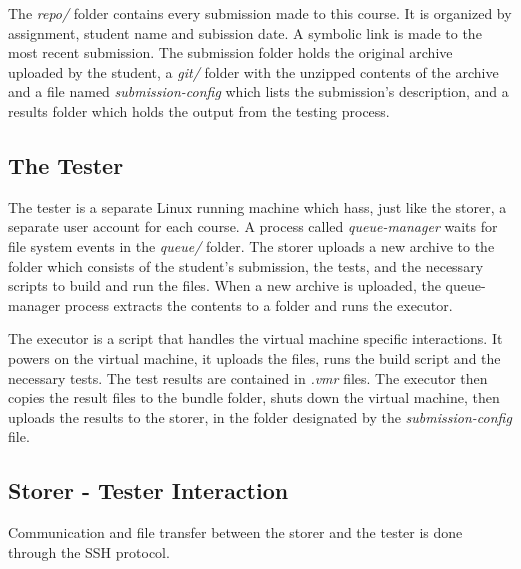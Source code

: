 \begin{center}
\end{center}

The \textit{repo/} folder contains every submission made to this course. It is organized
by assignment, student name and subission date. A symbolic link is made to the 
most recent submission. The submission folder holds the original archive uploaded
by the student, a \textit{git/} folder with the unzipped contents of the archive and a 
file named \textit{submission-config} which lists the submission's description, and a
results folder which holds the output from the testing process.

\subsection{The Tester}
\label{sub-sec:tester}

The tester is a separate Linux running machine which hass, just like the storer,
a separate user account for each course. A process called \textit{queue-manager}
waits for file system events in the \textit{queue/} folder. The storer uploads a new
archive to the folder which consists of the student's submission, the tests, and
the necessary scripts to build and run the files. When a new archive is uploaded,
the queue-manager process extracts the contents to a folder and runs the executor.

\begin{center}
\end{center}

The executor is a script that handles the virtual machine specific interactions.
It powers on the virtual machine, it uploads the files, runs the build script and
 the necessary tests. The test results are contained in \textit{.vmr} files.
The executor then copies the result files to the bundle folder, shuts down the
virtual machine, then uploads the results to the storer, in the folder designated
by the \textit{submission-config} file.


\subsection{Storer - Tester Interaction}
\label{sub-sec:interaction}

Communication and file transfer between the storer and the tester is done
through the SSH protocol. 

